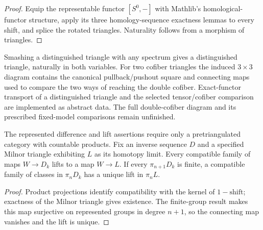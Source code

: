 \begin{proof}
  Equip the representable functor $[S^0,-]$ with Mathlib's homological-functor
  structure, apply its three homology-sequence exactness lemmas to every
  shift, and splice the rotated triangles.  Naturality follows from a morphism
  of triangles.
\end{proof}

\begin{definition}
  \label{def:smash-triangle}
  \notready
  Smashing a distinguished triangle with any spectrum gives a distinguished
  triangle, naturally in both variables.  For two cofiber triangles the
  induced $3\times3$ diagram contains the canonical pullback/pushout square
  and connecting maps used to compare the two ways of reaching the double
  cofiber.
  Exact-functor transport of a distinguished triangle and the selected
  tensor/cofiber comparison are implemented as abstract data. The full
  double-cofiber diagram and its prescribed fixed-model comparisons remain
  unfinished.
\end{definition}

\begin{proposition}
  \label{prop:finite-milnor-comparison}
  \leanok
  The represented difference and lift assertions require only a pretriangulated
  category with countable products. Fix an inverse sequence $D$ and a specified Milnor triangle exhibiting $L$ as its homotopy
  limit. Every compatible family of maps $W\to D_k$ lifts to a map $W\to L$.
  If every $\pi_{n+1}D_k$ is finite, a compatible family of classes in
  $\pi_nD_k$ has a unique lift in $\pi_nL$.
\end{proposition}
\begin{proof}
  Product projections identify compatibility with the kernel of
  $1-\mathrm{shift}$; exactness of the Milnor triangle gives existence.
  The finite-group result makes this map surjective on represented groups
  in degree $n+1$, so the connecting map vanishes and the lift is unique.
  \leanok
\end{proof}

